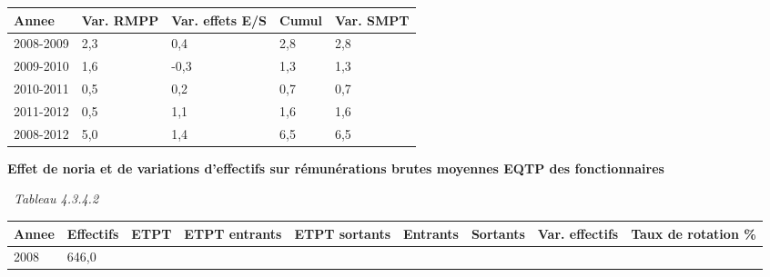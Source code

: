 \begin{longtable}[]{@{}lllll@{}}
\toprule
Annee & Var. RMPP & Var. effets E/S & Cumul & Var. SMPT\tabularnewline
\midrule
\endhead
2008-2009 & 2,3 & 0,4 & 2,8 & 2,8\tabularnewline
2009-2010 & 1,6 & -0,3 & 1,3 & 1,3\tabularnewline
2010-2011 & 0,5 & 0,2 & 0,7 & 0,7\tabularnewline
2011-2012 & 0,5 & 1,1 & 1,6 & 1,6\tabularnewline
2008-2012 & 5,0 & 1,4 & 6,5 & 6,5\tabularnewline
\bottomrule
\end{longtable}

\textbf{Effet de noria et de variations d'effectifs sur rémunérations
brutes moyennes EQTP des fonctionnaires}

~\emph{Tableau 4.3.4.2}

\begin{longtable}[]{@{}lllllllll@{}}
\toprule
\begin{minipage}[b]{0.05\columnwidth}\raggedright
Annee\strut
\end{minipage} & \begin{minipage}[b]{0.08\columnwidth}\raggedright
Effectifs\strut
\end{minipage} & \begin{minipage}[b]{0.05\columnwidth}\raggedright
ETPT\strut
\end{minipage} & \begin{minipage}[b]{0.10\columnwidth}\raggedright
ETPT entrants\strut
\end{minipage} & \begin{minipage}[b]{0.10\columnwidth}\raggedright
ETPT sortants\strut
\end{minipage} & \begin{minipage}[b]{0.07\columnwidth}\raggedright
Entrants\strut
\end{minipage} & \begin{minipage}[b]{0.07\columnwidth}\raggedright
Sortants\strut
\end{minipage} & \begin{minipage}[b]{0.11\columnwidth}\raggedright
Var. effectifs\strut
\end{minipage} & \begin{minipage}[b]{0.14\columnwidth}\raggedright
Taux de rotation \%\strut
\end{minipage}\tabularnewline
\midrule
\endhead
\begin{minipage}[t]{0.05\columnwidth}\raggedright
2008\strut
\end{minipage} & \begin{minipage}[t]{0.08\columnwidth}\raggedright
646,0\strut
\end{minipage} & \begin{minipage}[t]{0.05\columnwidth}\raggedright

\end{minipage}
\end{longtable}
